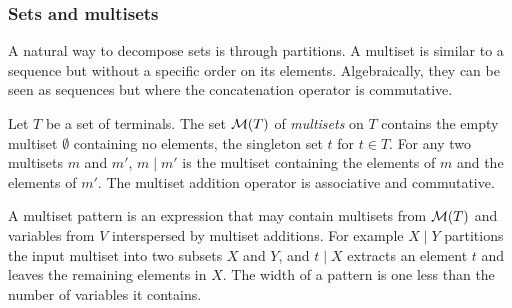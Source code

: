 



\subsubsection{Sets and multisets}

A natural way to decompose sets is through partitions.
A multiset is similar to a sequence but without a specific order on its elements.
Algebraically, they can be seen as sequences but where the concatenation operator is commutative.

Let \(T\) be a set of terminals. The set \(\mathcal{M}(T)\) of \emph{multisets} on \(T\) contains the empty multiset \(\emptyset\) containing no elements, the singleton set \(t\) for \(t \in T\).
For any two multisets \(m\) and \(m'\), \(m\mid m'\) is the multiset containing the elements of \(m\) and the elements of \(m'\).
The multiset addition operator is associative and commutative.

A multiset pattern is an expression that may contain multisets from \(\mathcal{M}(T)\) and variables from \(V\) interspersed by multiset additions.
For example \(X \mid Y\) partitions the input multiset into two subsets \(X\) and \(Y\), and \(t \mid X\) extracts an element \(t\) and leaves the remaining elements in \(X\).
The width of a pattern is one less than the number of variables it contains.


